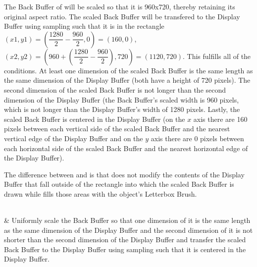 \begin{libreqtab2}
 \begin{example}
 The Back Buffer of  will be scaled so that it is 960x720, thereby retaining its original aspect ratio. The scaled Back Buffer will be transfered to the Display Buffer using sampling such that it is in the rectangle $(x1,y1) = (\dfrac{1280}{2} - \dfrac{960}{2},0) = (160,0)$, $(x2,y2) = (960 + (\dfrac{1280}{2} - \dfrac{960}{2}),720) = (1120,720)$. This fulfills all of the conditions. At least one dimension of the scaled Back Buffer is the same length as the same dimension of the Display Buffer (both have a height of 720 pixels). The second dimension of the scaled Back Buffer is not longer than the second dimension of the Display Buffer (the Back Buffer's scaled width is 960 pixels, which is not longer than the Display Buffer's width of 1280 pixels. Lastly, the scaled Back Buffer is centered in the Display Buffer (on the $x$ axis there are 160 pixels between each vertical side of the scaled Back Buffer and the nearest vertical edge of the Display Buffer and on the $y$ axis there are 0 pixels between each horizontal side of the scaled Back Buffer and the nearest horizontal edge of the Display Buffer).
 \end{example}
 \begin{note}
 The difference between  and  is that  does not modify the contents of the Display Buffer that fall outside of the rectangle into which the scaled Back Buffer is drawn while  fills those areas with the  object's Letterbox Brush.
 \end{note}
 \\
 & Uniformly scale the Back Buffer so that one dimension of it is the same length as the same dimension of the Display Buffer and the second dimension of it is not shorter than the second dimension of the Display Buffer and transfer the scaled Back Buffer to the Display Buffer using sampling such that it is centered in the Display Buffer.
 

\end{libreqtab2}
